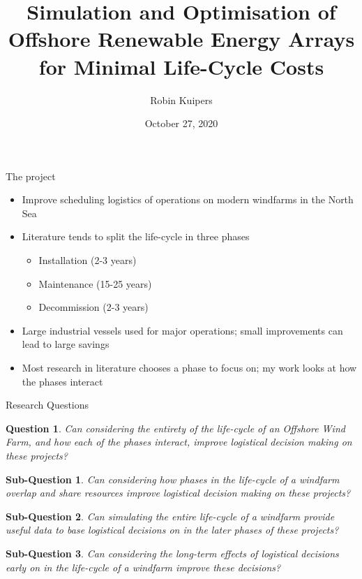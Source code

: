 \documentclass{beamer}
\title[Logistical Optimisation for Offshore Windfarms]{Simulation and Optimisation of Offshore Renewable Energy Arrays for Minimal Life-Cycle Costs}
\author{Robin Kuipers}
\date{October 27, 2020}
\newtheorem*{rquestion}{Question}
\newtheorem{subquestion}{Sub-Question}
\newcommand{\textapprox}{\raisebox{0.5ex}{\texttildelow}}
\begin{document}
\begin{frame}
  \titlepage
\end{frame}


\begin{frame}{The project}
  \begin{itemize}
  	\item Improve scheduling logistics of operations on modern windfarms in the North Sea
  	\item Literature tends to split the life-cycle in three phases
  	\begin{itemize}
  		\item Installation (\textapprox  2-3 years)
  		\item Maintenance (\textapprox 15-25 years)
  		\item Decommission (\textapprox 2-3 years)
  	\end{itemize}
  	\item Large industrial vessels used for major operations; small improvements can lead to large savings
	\item Most research in literature chooses a phase to focus on; my work looks at how the phases interact
  \end{itemize}
\end{frame}


\begin{frame}{Research Questions}
\small
\begin{rquestion}
Can considering the entirety of the life-cycle of an Offshore Wind Farm, and how each of the phases interact, improve logistical decision making on these projects?
\end{rquestion}

\bigskip

\begin{subquestion}
Can considering how phases in the life-cycle of a windfarm overlap and share resources improve logistical decision making on these projects?
\end{subquestion}

\begin{subquestion}
Can simulating the entire life-cycle of a windfarm provide useful data to base logistical decisions on in the later phases of these projects?
\end{subquestion}

\begin{subquestion}
Can considering the long-term effects of logistical decisions early on in the life-cycle of a windfarm improve these decisions? 
\end{subquestion}
\end{frame}
\end{document}
